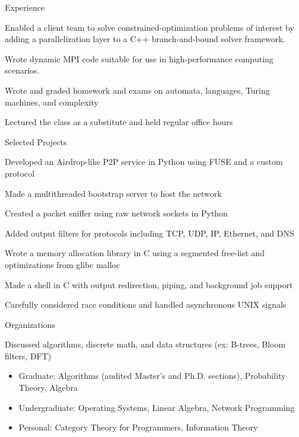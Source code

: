 \documentclass{cv}
\begin{document}
\begin{cvsection}{Experience}
{  }
  {
    \item Enabled a client team to solve constrained-optimization problems of interest by adding a parallelization layer to a C++ branch-and-bound solver framework.
    \item Wrote dynamic MPI code suitable for use in high-performance computing scenarios.
  }
  {
    \item Wrote and graded homework and exams on automata, languages, Turing machines, and complexity
    \item Lectured the class as a substitute and held regular office hours
  }
\end{cvsection}

\begin{cvsection}{Selected Projects}
  {
    \item Developed an Airdrop-like P2P service in Python using FUSE and a custom protocol
    \item Made a multithreaded bootstrap server to host the network
  }
  {
    \item Created a packet sniffer using raw network sockets in Python
    \item Added output filters for protocols including TCP, UDP, IP, Ethernet, and DNS
  }
  {
    \item Wrote a memory allocation library in C using a segmented free-list and optimizations from glibc malloc
  }
  {
    \item Made a shell in C with output redirection, piping, and background job support
    \item Carefully considered race conditions and handled asynchronous UNIX signals
  }
\end{cvsection}

\begin{cvsection}{Organizations}
  {
    \item Discussed algorithms, discrete math, and data structures (ex: B-trees, Bloom filters, DFT)
  }
\end{cvsection}

\begin{minipage}{\textwidth}
  \begin{itemize}[noitemsep,topsep=0pt]%
    \item Graduate: Algorithms (audited Master's and Ph.D. sections), Probability Theory, Algebra
    \item Undergraduate: Operating Systems, Linear Algebra, Network Programming
    \item Personal: Category Theory for Programmers, Information Theory
  \end{itemize}%
\end{minipage}%
\end{document}
